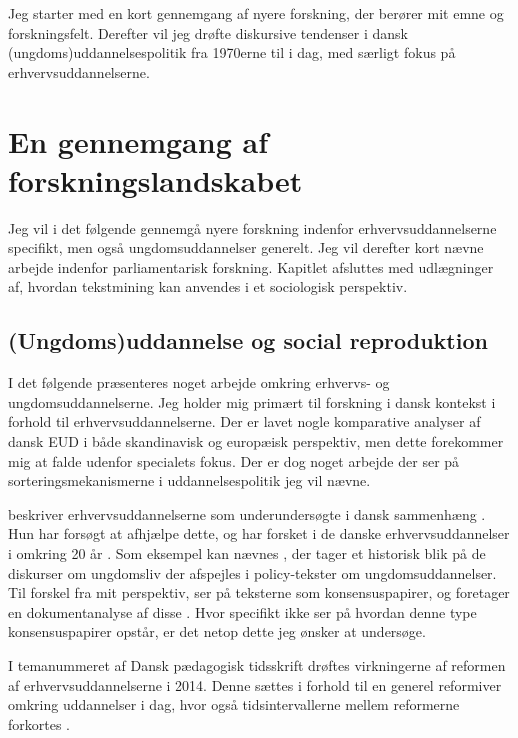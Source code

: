 Jeg starter med en kort gennemgang af nyere forskning, der berører mit emne og forskningsfelt.
Derefter vil jeg drøfte diskursive tendenser i dansk (ungdoms)uddannelsespolitik fra 1970erne til i dag, med særligt fokus på erhvervsuddannelserne.

\chapter{En gennemgang af forskningslandskabet}\label{sec:litreview}

Jeg vil i det følgende gennemgå nyere forskning indenfor erhvervsuddannelserne specifikt, men også ungdomsuddannelser generelt.
Jeg vil derefter kort nævne arbejde indenfor parliamentarisk forskning.
Kapitlet afsluttes med udlægninger af, hvordan tekstmining kan anvendes i et sociologisk perspektiv.

\section{(Ungdoms)uddannelse og social reproduktion}
I det følgende præsenteres noget arbejde omkring erhvervs- og ungdomsuddannelserne.
Jeg holder mig primært til forskning i dansk kontekst i forhold til erhvervsuddannelserne.
Der er lavet nogle komparative analyser af dansk EUD i både skandinavisk og europæisk perspektiv, men dette forekommer mig at falde udenfor specialets fokus.
Der er dog noget arbejde der ser på sorteringsmekanismerne i uddannelsespolitik jeg vil nævne.

\citeauthor{juulErhvervsuddannelserneForsomtForskningsomrade2004} beskriver erhvervsuddannelserne som underundersøgte i dansk sammenhæng \autocite{juulErhvervsuddannelserneForsomtForskningsomrade2004}.
Hun har forsøgt at afhjælpe dette, og har forsket i de danske erhvervsuddannelser i omkring 20 år \autocite{IdaJuulPublikationer}.
Som eksempel kan nævnes , der tager et historisk blik på de diskurser om ungdomsliv der afspejles i policy-tekster om ungdomsuddannelser.
Til forskel fra mit perspektiv, ser \citeauthor{juulDiskurserOmUngdom2013} på teksterne som konsensuspapirer, og foretager en dokumentanalyse af disse \autocite{juulDiskurserOmUngdom2013}.
Hvor \citeauthor{juulDiskurserOmUngdom2013} specifikt ikke ser på hvordan denne type konsensuspapirer opstår, er det netop dette jeg ønsker at undersøge.

I temanummeret  af Dansk pædagogisk tidsskrift drøftes virkningerne af reformen af erhvervsuddannelserne i 2014.
Denne sættes i forhold til en generel reformiver omkring uddannelser i dag, hvor også tidsintervallerne mellem reformerne forkortes \autocite[s. 2]{cangerTemaErhvervsuddannelserMellem2016}. 

